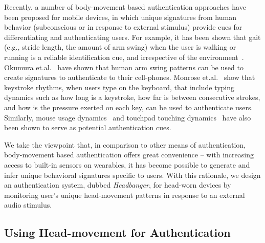 

Recently, a number of body-movement based authentication approaches have been proposed for mobile devices, in which unique signatures from human behavior (subconscious
or in response to external stimulus) provide cues for differentiating and
authenticating users. For example, it has been shown that gait (e.g.,
stride length, the amount of arm swing) when the user is walking or
running is a reliable identification cue, and irrespective of the
environment~\cite{stevenage1999visual}. Okumura et.al.~\cite{okumura2006study}
have shown that human arm swing patterns can be used to create signatures
to authenticate to their cell-phones. Monrose
et.al.~\cite{monrose2000keystroke} show that keystroke rhythms, when
users type on the keyboard, that include typing dynamics such as how
long is a keystroke, how far is between consecutive strokes, and how is the
pressure exerted on each key, can be used to authenticate
users. Similarly, mouse usage dynamics~\cite{jorgensen2011mouse} and touchpad
touching dynamics~\cite{bo2013silentsense,de2012touch} have also been shown to
serve as potential authentication cues.

We take the viewpoint that, in comparison to other means of authentication, body-movement based
authentication offers great convenience -- with increasing access to built-in sensors on wearables, it
has become possible to generate and infer unique behavioral signatures
specific to users. With this rationale, we design an authentication system, dubbed {\em Headbanger}, for head-worn
devices by monitoring user's unique head-movement patterns in response to an
external audio stimulus.

\subsection{Using Head-movement for Authentication}
\label{subsec:headmovements}


